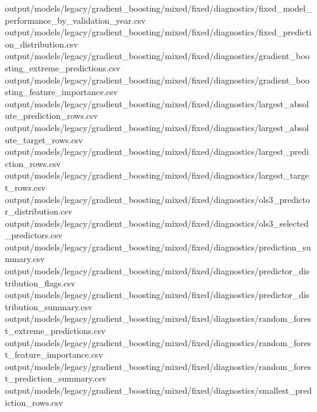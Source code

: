 \documentclass[
  11pt,
  a4paper]{article}
\newenvironment{Shaded}{}{}
\newcommand{\NormalTok}[1]{#1}
\begin{document}
\begin{Shaded}
\begin{Highlighting}[]
\NormalTok{output/models/legacy/gradient\_\allowbreak{}boosting/mixed/fixed/diagnostics/fixed\_\allowbreak{}model\_\allowbreak{}performance\_\allowbreak{}by\_\allowbreak{}validation\_\allowbreak{}year.csv}
\NormalTok{output/models/legacy/gradient\_\allowbreak{}boosting/mixed/fixed/diagnostics/fixed\_\allowbreak{}prediction\_\allowbreak{}distribution.csv}
\NormalTok{output/models/legacy/gradient\_\allowbreak{}boosting/mixed/fixed/diagnostics/gradient\_\allowbreak{}boosting\_\allowbreak{}extreme\_\allowbreak{}predictions.csv}
\NormalTok{output/models/legacy/gradient\_\allowbreak{}boosting/mixed/fixed/diagnostics/gradient\_\allowbreak{}boosting\_\allowbreak{}feature\_\allowbreak{}importance.csv}
\NormalTok{output/models/legacy/gradient\_\allowbreak{}boosting/mixed/fixed/diagnostics/largest\_\allowbreak{}absolute\_\allowbreak{}prediction\_\allowbreak{}rows.csv}
\NormalTok{output/models/legacy/gradient\_\allowbreak{}boosting/mixed/fixed/diagnostics/largest\_\allowbreak{}absolute\_\allowbreak{}target\_\allowbreak{}rows.csv}
\NormalTok{output/models/legacy/gradient\_\allowbreak{}boosting/mixed/fixed/diagnostics/largest\_\allowbreak{}prediction\_\allowbreak{}rows.csv}
\NormalTok{output/models/legacy/gradient\_\allowbreak{}boosting/mixed/fixed/diagnostics/largest\_\allowbreak{}target\_\allowbreak{}rows.csv}
\NormalTok{output/models/legacy/gradient\_\allowbreak{}boosting/mixed/fixed/diagnostics/ols3\_\allowbreak{}predictor\_\allowbreak{}distribution.csv}
\NormalTok{output/models/legacy/gradient\_\allowbreak{}boosting/mixed/fixed/diagnostics/ols3\_\allowbreak{}selected\_\allowbreak{}predictors.csv}
\NormalTok{output/models/legacy/gradient\_\allowbreak{}boosting/mixed/fixed/diagnostics/prediction\_\allowbreak{}summary.csv}
\NormalTok{output/models/legacy/gradient\_\allowbreak{}boosting/mixed/fixed/diagnostics/predictor\_\allowbreak{}distribution\_\allowbreak{}flags.csv}
\NormalTok{output/models/legacy/gradient\_\allowbreak{}boosting/mixed/fixed/diagnostics/predictor\_\allowbreak{}distribution\_\allowbreak{}summary.csv}
\NormalTok{output/models/legacy/gradient\_\allowbreak{}boosting/mixed/fixed/diagnostics/random\_\allowbreak{}forest\_\allowbreak{}extreme\_\allowbreak{}predictions.csv}
\NormalTok{output/models/legacy/gradient\_\allowbreak{}boosting/mixed/fixed/diagnostics/random\_\allowbreak{}forest\_\allowbreak{}feature\_\allowbreak{}importance.csv}
\NormalTok{output/models/legacy/gradient\_\allowbreak{}boosting/mixed/fixed/diagnostics/random\_\allowbreak{}forest\_\allowbreak{}prediction\_\allowbreak{}summary.csv}
\NormalTok{output/models/legacy/gradient\_\allowbreak{}boosting/mixed/fixed/diagnostics/smallest\_\allowbreak{}prediction\_\allowbreak{}rows.csv}

\end{Highlighting}
\end{Shaded}
\end{document}
